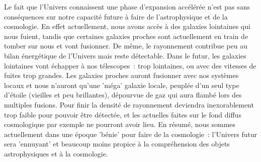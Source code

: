 Le fait que l'Univers connaissent une phase d'expansion accélérée n'est pas sans conséquences sur notre capacité future à faire de l'astrophysique et de la cosmologie. En effet actuellement, nous avons accès à des galaxies lointaines qui nous fuient, tandis que certaines galaxies proches sont actuellement en train de tomber sur nous et vont fusionner. De même, le rayonnement contribue peu au bilan énergétique de l'Univers mais reste détectable. Dans le futur, les galaxies lointaines vont échapper à nos télescopes~: trop lointaines, ou avec des vitesses de fuites trop grandes. Les galaxies proches auront fusionner avec nos systèmes locaux et nous n'auront qu'une 'méga' galaxie locale, peuplée d'un seul type d'étoile (vieilles et peu brillantes), dépourvue de gaz qui aura flambé lors des multiples fusions. Pour finir la densité de rayonnement deviendra inexorablement trop faible pour pouvoir être détectée, et les actuelles faites sur le fond diffus cosmologique par exemple ne pourront avoir lieu. En résumé, nous sommes actuellement dans une époque 'bénie' pour faire de la cosmologie~: l'Univers futur sera 'ennuyant' et beaucoup moins propice à la compréhension des objets astrophysiques et à la cosmologie.